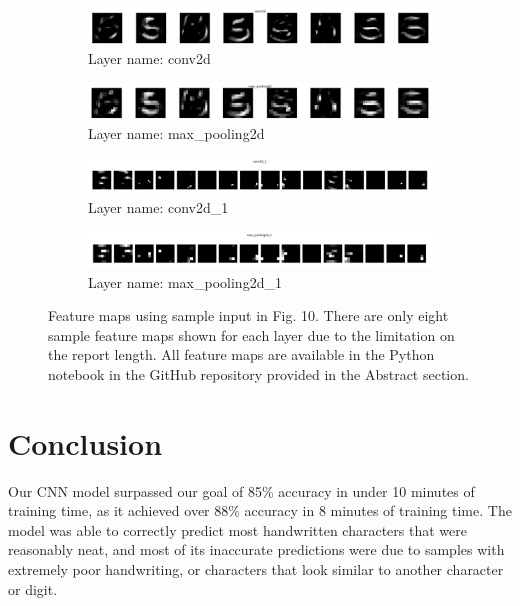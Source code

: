 \documentclass[conference]{IEEEtran}
\begin{document}
\begin{figure}
  \centering
  \begin{subfigure}{1\linewidth}
    \includegraphics[width=\linewidth]{images/conv2d1.jpg}
     \caption{Layer name: conv2d}
  \end{subfigure}
  \begin{subfigure}{1\linewidth}
    \includegraphics[width=\linewidth]{images/pool2d1.jpg}
    \caption{Layer name: max\_pooling2d}
  \end{subfigure}
  \begin{subfigure}{1\linewidth}
    \includegraphics[width=\linewidth]{images/conv2d2.jpg}
    \caption{Layer name: conv2d\_1}
  \end{subfigure}
  \begin{subfigure}{1\linewidth}
    \includegraphics[width=\linewidth]{images/pool2d2.jpg}
    \caption{Layer name: max\_pooling2d\_1}
  \end{subfigure}
  \caption{Feature maps using sample input in Fig. 10. There are only eight sample feature maps shown for each layer due to the limitation on the report length. All feature maps are available in the Python notebook in the GitHub repository provided in the Abstract section.}
  \label{fig:feature maps}
\end{figure}


\section{Conclusion}

Our CNN model surpassed our goal of 85\% accuracy in under 10 minutes of training time, as it achieved over 88\% accuracy in 8 minutes of training time. The model was able to correctly predict most handwritten characters that were reasonably neat, and most of its inaccurate predictions were due to samples with extremely poor handwriting, or characters that look similar to another character or digit. 
\end{document}
